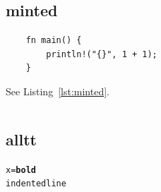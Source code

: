 \subsection{minted}
\begin{listing}[H]
\begin{verbatim}
    fn main() {
        println!("{}", 1 + 1);
    }
\end{verbatim}
\caption{A minted listing}
\label{lst:minted}
\end{listing}
See Listing~\ref{lst:minted}.
\inputminted[firstline=2, lastline=3]{python}{chapters/hello.py}

\subsection{alltt}
\begin{alltt}
x  =  \textbf{bold}   %
  indented line
\end{alltt}
